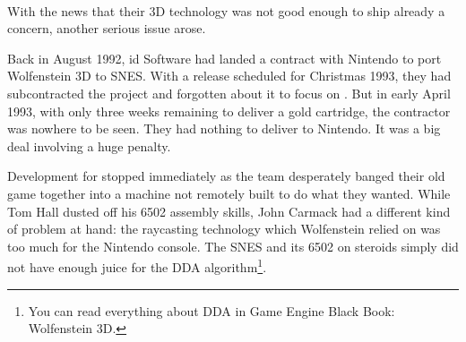 \\
\par
{}%
\label{HUD_screenshot}
\par
With the news that their 3D technology was not good enough to ship already a concern, another serious issue arose.\\
\par
Back in August 1992, id Software had landed a contract with Nintendo to port Wolfenstein 3D to SNES. With a release scheduled for Christmas 1993, they had subcontracted the project and forgotten about it to focus on \doom. But in early April 1993, with only three weeks remaining to deliver a gold cartridge, the contractor was nowhere to be seen. They had nothing to deliver to Nintendo. It was a big deal involving a huge penalty.\\
\par
 Development for \doom{} stopped immediately as the team desperately banged their old game together into a machine not remotely built to do what they wanted. While Tom Hall dusted off his 6502 assembly skills, John Carmack had a different kind of problem at hand: the raycasting technology which Wolfenstein relied on was too much for the Nintendo console. The SNES and its 6502 on steroids simply did not have enough juice for the DDA algorithm\footnote{You can read everything about DDA in Game Engine Black Book: Wolfenstein 3D.}.\\%
\par




